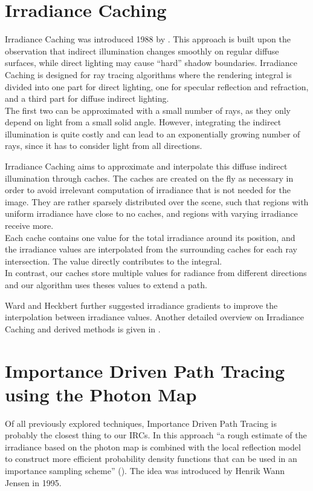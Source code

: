 \section{Irradiance Caching}
\label{irradiance caching}


Irradiance Caching was introduced 1988 by \cite{ward}. This approach is built upon the observation that indirect illumination changes smoothly on regular diffuse surfaces, while direct lighting may cause ``hard'' shadow boundaries. Irradiance Caching is designed for ray tracing algorithms where the rendering integral is divided into one part for direct lighting, one for specular reflection and refraction, and a third part for diffuse indirect lighting.\\
The first two can be approximated with a small number of rays, as they only depend on light from a small solid angle. However, integrating the indirect illumination is quite costly and can lead to an exponentially growing number of rays, since it has to consider light from all directions.

 Irradiance Caching aims to approximate and interpolate this diffuse indirect illumination through caches. The caches are created on the fly as necessary in order to avoid irrelevant computation of irradiance that is not needed for the image. They are rather sparsely distributed over the scene, such that regions with uniform irradiance have close to no caches, and regions with varying irradiance receive more.\\
 Each cache contains one value for the total irradiance around its position, and the irradiance values are interpolated from the surrounding caches for each ray intersection. The value directly contributes to the integral.\\
In contrast, our caches store multiple values for radiance from different directions and our algorithm uses theses values to extend a path.

Ward and Heckbert further suggested irradiance gradients \cite{ward2} to improve the interpolation between irradiance values. Another detailed overview on Irradiance Caching and derived methods is given in \cite[chapter 3]{irrc1}.



\section{Importance Driven Path Tracing using the Photon Map}
\label{idpt chapter}
Of all previously explored techniques, Importance Driven Path Tracing is probably the closest thing to our IRCs. In this approach ``a rough estimate of the irradiance based on the photon map is combined with the local reflection model to construct more efficient probability density functions that can be used in an importance sampling scheme'' (\cite[abstract]{idpt}). The idea was introduced by Henrik Wann Jensen in 1995.

